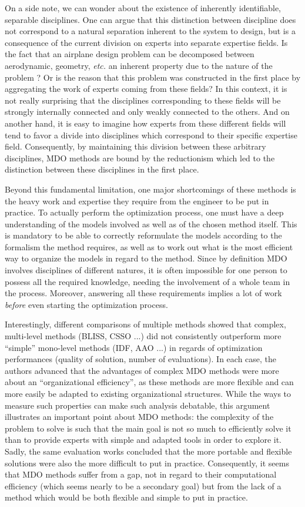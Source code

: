 On a side note, we can wonder about the existence of inherently identifiable, separable disciplines. One can argue that this distinction between discipline does not correspond to a natural separation inherent to the system to design, but is a consequence of the current division on experts into separate expertise fields. Is the fact that an airplane design problem can be decomposed between aerodynamic, geometry, \emph{etc.} an inherent property due to the nature of the problem ? Or is the reason that this problem was constructed in the first place by aggregating the work of experts coming from these fields? In this context, it is not really surprising that the disciplines corresponding to these fields will be strongly internally connected and only weakly connected to the others. And on another hand, it is easy to imagine how experts from these different fields will tend to favor a divide into disciplines which correspond to their specific expertise field. Consequently, by maintaining this division between these arbitrary disciplines, MDO methods are bound by the reductionism which led to the distinction between these disciplines in the first place.

Beyond this fundamental limitation, one major shortcomings of these methods is the heavy work and expertise they require from the engineer to be put in practice. To actually perform the optimization process, one must have a deep understanding of the models involved as well as of the chosen method itself. This is mandatory to be able to correctly reformulate the models according to the formalism the method requires, as well as to work out what is the most efficient way to organize the models in regard to the method. Since by definition MDO involves disciplines of different natures, it is often impossible for one person to possess all the required knowledge, needing the involvement of a whole team in the process. Moreover, answering all these requirements implies a lot of work \emph{before} even starting the optimization process.

Interestingly, different comparisons of multiple methods \cite{perez2004evaluation,Yi2008} showed that complex, multi-level methods (BLISS, CSSO ...) did not consistently outperform more \enquote{simple} mono-level methods (IDF, AAO ...) in regards of optimization performances (quality of solution, number of evaluations). In each case, the authors advanced that the advantages of complex MDO methods were more about an \enquote{organizational efficiency}, as these methods are more flexible and can more easily be adapted to existing organizational structures. While the ways to measure such properties can make such analysis debatable, this argument illustrates an important point about MDO methods: the complexity of the problem to solve is such that the main goal is not so much to efficiently solve it than to provide experts with simple and adapted tools in order to explore it. Sadly, the same evaluation works concluded that the more portable and flexible solutions were also the more difficult to put in practice. Consequently, it seems that MDO methods suffer from a gap, not in regard to their computational efficiency (which seems nearly to be a secondary goal) but from the lack of a method which would be both flexible and simple to put in practice.

